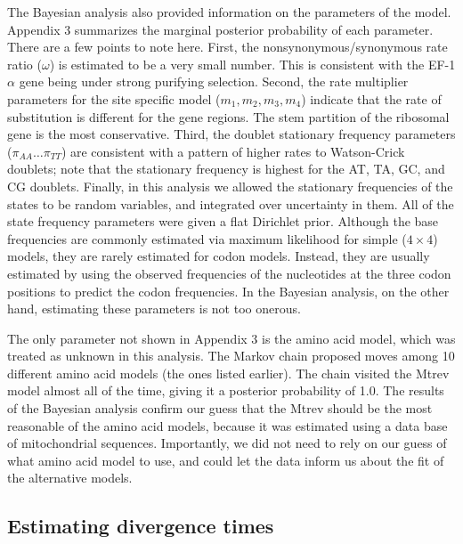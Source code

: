 \documentclass{svmult}
\begin{document}
The Bayesian analysis also provided information on the parameters of the model. Appendix 3
summarizes the marginal posterior probability of each parameter. There are a few points to note here. First, the nonsynonymous/synonymous
rate ratio ($\omega$) is estimated to be a very small number. This is consistent with the EF-1$\alpha$ gene being under strong purifying
selection. Second, the rate multiplier parameters for the site specific model ($m_1, m_2, m_3, m_4$) indicate that the rate of substitution
is different for the gene regions. The stem partition of the ribosomal gene is the most conservative. Third, the doublet stationary frequency
parameters ($\pi_{AA} \ldots \pi_{TT}$) are consistent with a pattern of higher rates to Watson-Crick doublets; note that the stationary
frequency is highest for the AT, TA, GC, and CG doublets. Finally, in this analysis we allowed the stationary frequencies of the states
to be random variables, and integrated over uncertainty in them. All of the state frequency parameters were given a flat Dirichlet prior. Although the
base frequencies are commonly estimated via maximum likelihood for simple ($4 \times 4$) models, they are rarely estimated for codon models.
Instead, they are usually estimated by using the observed frequencies of the nucleotides at the three codon positions to predict the
codon frequencies. In the Bayesian analysis, on the other hand, estimating these parameters is not too onerous.

The only parameter not shown in Appendix 3 is the amino acid model, which was treated as unknown in this analysis. The Markov chain
proposed moves among 10 different amino acid models (the ones listed earlier). The chain visited the Mtrev model almost all of the time, giving
it a posterior probability of 1.0. The results of the Bayesian analysis confirm our guess that the Mtrev should be the most reasonable of the amino acid models, because
it was estimated using a data base of mitochondrial sequences. Importantly, we did not need to rely on our guess of what amino acid
model to use, and could let the data inform us about the fit of the alternative models.

\subsection{Estimating divergence times}
\end{document}
